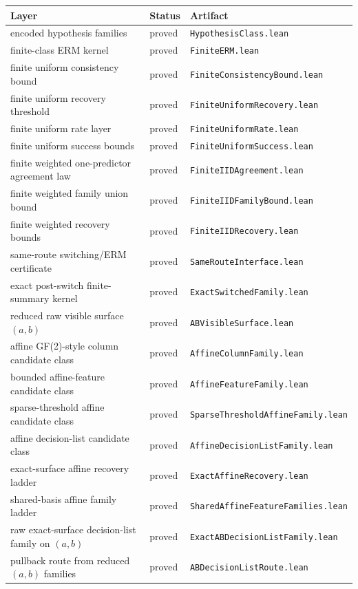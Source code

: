 \documentclass[11pt]{article}
\theoremstyle{remark}
\begin{document}
\begin{center}
\begin{tabular}{lll}
\toprule
\textbf{Layer} & \textbf{Status} & \textbf{Artifact} \\
\midrule
encoded hypothesis families & proved & \texttt{HypothesisClass.lean} \\
finite-class ERM kernel & proved & \texttt{FiniteERM.lean} \\
finite uniform consistency bound & proved & \texttt{FiniteConsistencyBound.lean} \\
finite uniform recovery threshold & proved & \texttt{FiniteUniformRecovery.lean} \\
finite uniform rate layer & proved & \texttt{FiniteUniformRate.lean} \\
finite uniform success bounds & proved & \texttt{FiniteUniformSuccess.lean} \\
finite weighted one-predictor agreement law & proved & \texttt{FiniteIIDAgreement.lean} \\
finite weighted family union bound & proved & \texttt{FiniteIIDFamilyBound.lean} \\
finite weighted recovery bounds & proved & \texttt{FiniteIIDRecovery.lean} \\
same-route switching/ERM certificate & proved & \texttt{SameRouteInterface.lean} \\
exact post-switch finite-summary kernel & proved & \texttt{ExactSwitchedFamily.lean} \\
reduced raw visible surface $(a,b)$ & proved & \texttt{ABVisibleSurface.lean} \\
affine GF(2)-style column candidate class & proved & \texttt{AffineColumnFamily.lean} \\
bounded affine-feature candidate class & proved & \texttt{AffineFeatureFamily.lean} \\
sparse-threshold affine candidate class & proved & \texttt{SparseThresholdAffineFamily.lean} \\
affine decision-list candidate class & proved & \texttt{AffineDecisionListFamily.lean} \\
exact-surface affine recovery ladder & proved & \texttt{ExactAffineRecovery.lean} \\
shared-basis affine family ladder & proved & \texttt{SharedAffineFeatureFamilies.lean} \\
raw exact-surface decision-list family on $(a,b)$ & proved & \texttt{ExactABDecisionListFamily.lean} \\
pullback route from reduced $(a,b)$ families & proved & \texttt{ABDecisionListRoute.lean} \\

\end{tabular}
\end{center}
\end{document}
